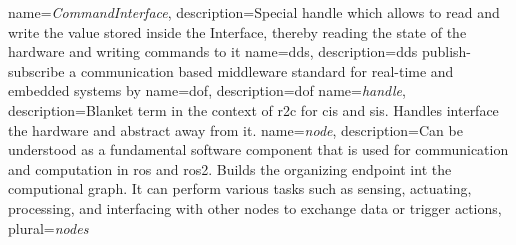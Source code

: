 \hyphenation{
}

\newcommand{\mybibliographyfiles}{Bibliography/ipr_articles,Bibliography/kit_template_example_bibliography,Bibliography/masterthesis}


{
    name={\textit{CommandInterface}},
    description={Special \gls{handle} which allows to read and write the value stored inside the Interface, thereby reading the state of the hardware and writing commands to it}
}
{
    name={\gls{dds}},
    description={\acrlong{dds} publish-subscribe a communication based middleware standard for real-time and embedded systems by \cite{pardo-castellote_omg_2003, schlesselman_omg_2004, noauthor_data_nodate}}
}
{
    name={\gls{dof}},
    description={\acrlong{dof}}
}
{
    name={\textit{handle}},
    description={Blanket term in the context of \gls{r2c} for \glspl{ci} and \glspl{si}. Handles interface the hardware and abstract away from it. }
}
{
    name={\textit{node}},
    description={Can be understood as a fundamental software component that is used for communication and computation in \gls{ros} and \gls{ros2}. Builds the organizing endpoint int the computional graph. It can perform various tasks such as sensing, actuating, processing, and interfacing with other nodes to exchange data or trigger actions},
    plural={\textit{nodes}}
}
